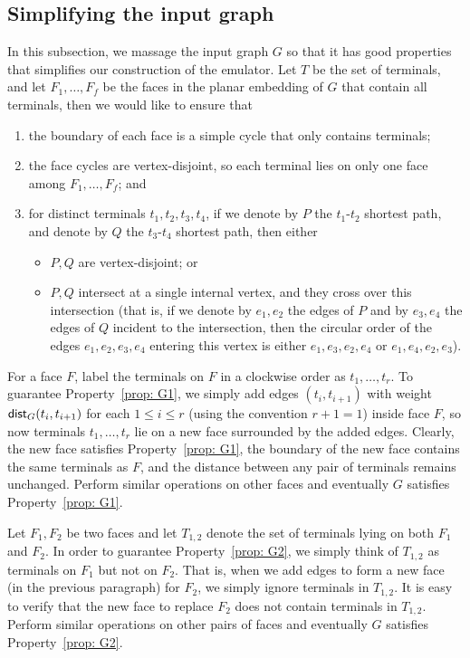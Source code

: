 \documentclass[11pt]{article}
\newcommand{\dist}{\textnormal{\textsf{dist}}}
\newenvironment{properties}[2][0]
{\renewcommand{\theenumi}{#2\arabic{enumi}}
	\begin{enumerate} \setcounter{enumi}{#1}}{\end{enumerate}\renewcommand{\theenumi}{\arabic{enumi}}}
\begin{document}
\subsection{Simplifying the input graph}

In this subsection, we massage the input graph $G$ so that it has good properties that simplifies our construction of the emulator. Let $T$ be the set of terminals, and let $F_1,\ldots,F_f$ be the faces in the planar embedding of $G$ that contain all terminals, then we would like to ensure that

\begin{properties}{G}
\item the boundary of each face is a simple cycle that only contains terminals;\label{prop: G1}
\item the face cycles are vertex-disjoint, so each terminal lies on only one face among $F_1,\ldots,F_f$; and \label{prop: G2}
\item for distinct terminals $t_1,t_2,t_3,t_4$, if we denote by $P$ the $t_1$-$t_2$ shortest path, and denote by $Q$ the $t_3$-$t_4$ shortest path, then either
\begin{itemize}
    \item $P,Q$ are vertex-disjoint; or
    \item $P,Q$ intersect at a single internal vertex, and they cross over this intersection (that is, if we denote by $e_1,e_2$ the edges of $P$ and by $e_3,e_4$ the edges of $Q$ incident to the intersection, then the circular order of the edges $e_1,e_2,e_3,e_4$ entering this vertex is either $e_1,e_3,e_2,e_4$ or $e_1,e_4,e_2,e_3$).
\end{itemize}\label{prop: G3}
\end{properties}

For a face $F$, label the terminals on $F$ in a clockwise order as $t_1,\ldots,t_{r}$. To guarantee Property~\ref{prop: G1}, we simply add edges $(t_i,t_{i+1})$ with weight $\dist_G(t_i,t_{i+1})$ for each $1\le i\le r$ (using the convention $r+1=1$) inside face $F$, so now terminals $t_1,\ldots,t_{r}$ lie on a new face surrounded by the added edges. Clearly, the new face satisfies Property~\ref{prop: G1}, the boundary of the new face contains the same terminals as $F$, and the distance between any pair of terminals remains unchanged. Perform similar operations on other faces and eventually $G$ satisfies Property~\ref{prop: G1}.

Let $F_1,F_2$ be two faces and let $T_{1,2}$ denote the set of terminals lying on both $F_1$ and $F_2$. In order to guarantee Property~\ref{prop: G2}, we simply think of $T_{1,2}$ as terminals on $F_1$ but not on $F_2$. That is, when we add edges to form a new face (in the previous paragraph) for $F_2$, we simply ignore terminals in $T_{1,2}$. It is easy to verify that the new face to replace $F_2$ does not contain terminals in $T_{1,2}$. Perform similar operations on other pairs of faces and eventually $G$ satisfies Property~\ref{prop: G2}.
\end{document}
